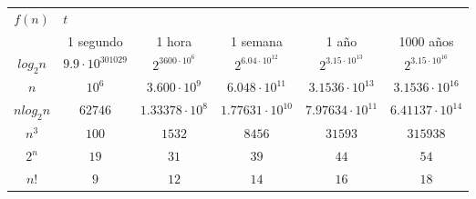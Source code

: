 \begin{table}[!htbp]
\centering
\label{Tabla}
\begin{tabular}{|c|c|c|c|c|c|}
\hline
 \multirow{2}{*}{$f(n)$}& \multicolumn{5}{l|}{\hfil$t$} \\ \cline{2-6} 
 &  1 segundo  & 1 hora   & 1 semana   &  1 año  & 1000 años  \\ \hline
 $log_2n$ &  $9.9 \cdot 10^{301029}$  &  $2^{3600\cdot 10^6}$  &  $2^{6.04\cdot 10^{12}}$  &  $2^{3.15\cdot 10^{13}}$  &  $2^{3.15\cdot 10^{16}}$ \\ \hline
 $n$&  $10^6$  &  $3.600\cdot 10^9 $  &  $6.048 \cdot 10^{11}$  &  $3.1536 \cdot 10^{13}$  & $3.1536 \cdot 10^{16}$  \\ \hline
 $nlog_2n$&  $62746$  &  $1.33378\cdot 10^8$  &  $1.77631\cdot 10^{10}$  &  $7.97634\cdot 10^{11}$  &  $6.41137\cdot 10^{14}$ \\ \hline
 $n^3$&  $100$  &  $1532$  &  $8456$  &  $31593$  & $315938$  \\ \hline
 $2^n$&  $19$  &  $31$  & $39$   &  $44$  & $54$  \\ \hline
 $n!$&  $9$  &  $12$  &  $14$  &  $16$  &  $18$ \\ \hline
\end{tabular}
\end{table}